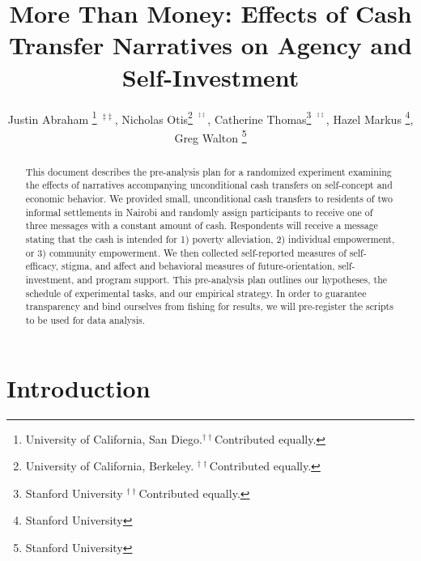 \documentclass[11pt, a4paper]{article}\usepackage[]{graphicx}\usepackage[]{color}
\begin{document}

\title{More Than Money: Effects of Cash Transfer Narratives on Agency and Self-Investment}
\begin{onehalfspace}

\author{
  Justin Abraham \thanks{University of California, San Diego.$^{\dagger\dagger}$Contributed
equally.}~$^{\ddagger\ddagger}$,
  Nicholas Otis\thanks{University of California, Berkeley. $^{\dagger\dagger}$Contributed
equally.}~$^{^{\ddagger\ddagger}}$,
  Catherine Thomas\thanks{Stanford University $^{\dagger\dagger}$Contributed equally.}~$^{^{\ddagger\ddagger}}$,
  Hazel Markus \thanks{Stanford University },
  Greg Walton \thanks{Stanford University }
        }

\end{onehalfspace}

\maketitle

\begin{abstract}

    This document describes the pre-analysis plan for a randomized experiment examining the effects of narratives accompanying unconditional cash transfers on self-concept and economic behavior. We provided small, unconditional cash transfers to residents of two informal settlements in Nairobi and randomly assign participants to receive one of three messages with a constant amount of cash. Respondents will receive a message stating that the cash is intended for 1) poverty alleviation, 2) individual empowerment, or 3) community empowerment. We then collected self-reported measures of self-efficacy, stigma, and affect and behavioral measures of future-orientation, self-investment, and program support. This pre-analysis plan outlines our hypotheses, the schedule of experimental tasks, and our empirical strategy. In order to guarantee transparency and bind ourselves from fishing for results, we will pre-register the scripts to be used for data analysis.

\end{abstract}

\newpage

\tableofcontents

\newpage

\section{Introduction}
\end{document}
